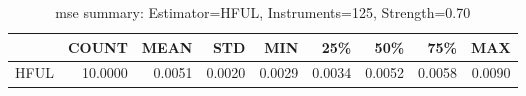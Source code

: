 \begin{table}[ht]
\centering
\caption{mse summary: Estimator=HFUL, Instruments=125, Strength=0.70}
\begin{tabular}{lrrrrrrrr}
\toprule
 & COUNT & MEAN & STD & MIN & 25\% & 50\% & 75\% & MAX \\
\midrule
HFUL & 10.0000 & 0.0051 & 0.0020 & 0.0029 & 0.0034 & 0.0052 & 0.0058 & 0.0090 \\
\bottomrule
\end{tabular}
\end{table}
